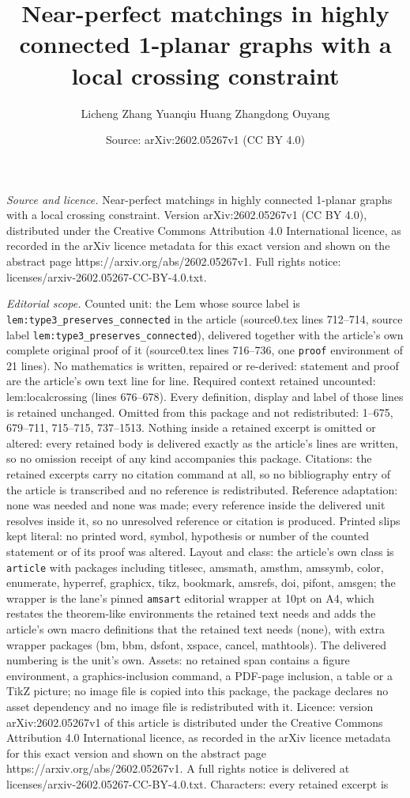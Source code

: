 \documentclass[10pt,a4paper]{amsart}
\title[Near-perfect matchings in highly connected 1-planar graphs w]{Near-perfect matchings in highly connected 1-planar graphs with a local crossing constraint}
\author{Licheng Zhang Yuanqiu Huang Zhangdong Ouyang}
\date{Source: arXiv:2602.05267v1 (CC BY 4.0)}
\begin{document}
\maketitle

\noindent\emph{Source and licence.} Near-perfect matchings in highly connected 1-planar graphs with a local crossing constraint. Version arXiv:2602.05267v1 (CC BY 4.0), distributed under the Creative Commons Attribution 4.0 International licence, as recorded in the arXiv licence metadata for this exact version and shown on the abstract page https://arxiv.org/abs/2602.05267v1. Full rights notice: licenses/arxiv-2602.05267-CC-BY-4.0.txt.\par\smallskip

\noindent\textit{Editorial scope.} Counted unit: the Lem whose source label is \texttt{lem:type3\_preserves\_connected} in the article (source0.tex lines 712--714, source label \texttt{lem:type3\_preserves\_connected}), delivered together with the article's own complete original proof of it (source0.tex lines 716--736, one \texttt{proof} environment of 21 lines). No mathematics is written, repaired or re-derived: statement and proof are the article's own text line for line. Required context retained uncounted: lem:localcrossing (lines 676--678). Every definition, display and label of those lines is retained unchanged. Omitted from this package and not redistributed: 1--675, 679--711, 715--715, 737--1513. Nothing inside a retained excerpt is omitted or altered: every retained body is delivered exactly as the article's lines are written, so no omission receipt of any kind accompanies this package. Citations: the retained excerpts carry no citation command at all, so no bibliography entry of the article is transcribed and no reference is redistributed. Reference adaptation: none was needed and none was made; every reference inside the delivered unit resolves inside it, so no unresolved reference or citation is produced. Printed slips kept literal: no printed word, symbol, hypothesis or number of the counted statement or of its proof was altered. Layout and class: the article's own class is \texttt{article} with packages including titlesec, amsmath, amsthm, amssymb, color, enumerate, hyperref, graphicx, tikz, bookmark, amsrefs, doi, pifont, amsgen; the wrapper is the lane's pinned \texttt{amsart} editorial wrapper at 10pt on A4, which restates the theorem-like environments the retained text needs and adds the article's own macro definitions that the retained text needs (none), with extra wrapper packages (bm, bbm, dsfont, xspace, cancel, mathtools). The delivered numbering is the unit's own. Assets: no retained span contains a figure environment, a graphics-inclusion command, a PDF-page inclusion, a table or a TikZ picture; no image file is copied into this package, the package declares no asset dependency and no image file is redistributed with it. Licence: version arXiv:2602.05267v1 of this article is distributed under the Creative Commons Attribution 4.0 International licence, as recorded in the arXiv licence metadata for this exact version and shown on the abstract page https://arxiv.org/abs/2602.05267v1. A full rights notice is delivered at licenses/arxiv-2602.05267-CC-BY-4.0.txt. Characters: every retained excerpt is 
\end{document}
